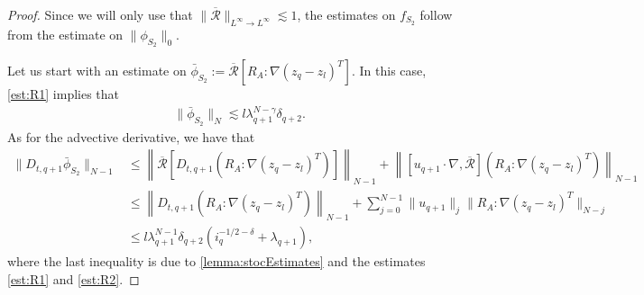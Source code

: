 \documentclass[10pt,a4paper]{amsart}
\numberwithin{equation}{section}
\numberwithin{corollario}{section}
\numberwithin{lemma}{section}
\numberwithin{prop}{section}
\theoremstyle{definition}
\theoremstyle{remark}
\newcommand{\qq}{_{q+1}}
\newcommand{\qqq}{_{q+2}}
\begin{document}
\begin{proof}
Since we will only use that $\|\overline{\mathcal{R}}\|_{L^{\infty}\to L^{\infty}}\lesssim 1$, the estimates on $f_{S_2}$
follow from the estimate on $\|\phi_{S_2}\|_0$.


Let us start with an estimate on $\bar{\phi}_{S_2}
:= \overline{\mathcal{R}}[R_A:\nabla(z_q-z_l)^T]$.
In this case, \eqref{est:R1} implies that
\begin{align}\label{est:phiS2first}
    &\|\bar{\phi}_{S_2}\|_N  \lesssim l\lambda\qq^{N-\gamma}\delta\qqq.
\end{align}
As for the advective derivative, we have that
\begin{equation}
\begin{aligned}
    \|D_{t,q+1}\bar{\phi}_{S_2}\|_{N-1}
    &\le 
    \left\|\overline{\mathcal{R}}[D_{t,q+1}\left(R_A:\nabla(z_q-z_l)^T\right)]\right\|_{N-1}
    +
    \left\|[u\qq\cdot\nabla,\overline{\mathcal{R}}](R_A:\nabla(z_q-z_l)^T)\right\|_{N-1}\\
    &\le \left\|D_{t,q+1}\left(R_A:\nabla(z_q-z_l)^T\right)\right\|_{N-1}+\sum_{j=0}^{N-1}\|u\qq\|_j\|R_A:\nabla(z_q-z_l)^T\|_{N-j}\\
    &\le l\lambda\qq^{N-1}\delta\qqq \left(i_q^{-1/2-\delta}+\lambda\qq\right),
\end{aligned}
\end{equation}
where the last inequality is due to \autoref{lemma:stocEstimates} and the estimates \eqref{est:R1} and \eqref{est:R2}.


\end{proof}
\end{document}
